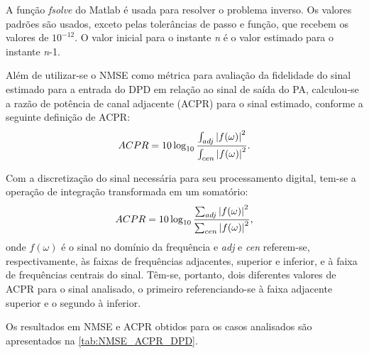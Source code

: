 A função \textit{fsolve} do Matlab é usada para resolver o problema inverso. Os valores padrões são usados, exceto pelas tolerâncias de passo e função, que recebem os valores de {$10^{-12}$}. O valor inicial para o instante \textit{n} é o valor estimado para o instante \textit{n}-1.

Além de utilizar-se o NMSE como métrica para avaliação da fidelidade do sinal estimado para a entrada do DPD em relação ao sinal de saída do PA, calculou-se a razão de potência de canal adjacente (ACPR) para o sinal estimado, conforme a seguinte definição de ACPR:
\begin{equation}
ACPR = 10\log_{10}\frac
{\int_{adj}\abs{f(\omega)}^{2}}
{\int_{cen}\abs{f(\omega)}^{2}}.
\label{acprdisc_int}
\end{equation}

Com a discretização do sinal necessária para seu processamento digital, tem-se a operação de integração transformada em um somatório:
\begin{equation}
ACPR = 10\log_{10}\frac
{\sum_{adj}\abs{f(\omega)}^{2}}
{\sum_{cen}\abs{f(\omega)}^{2}},
\label{acprdisc}
\end{equation}
onde $f(\omega)$ é o sinal no domínio da frequência e \textit{adj} e \textit{cen} referem-se, respectivamente, às faixas de frequências adjacentes, superior e inferior, e à faixa de frequências centrais do sinal. Têm-se, portanto, dois diferentes valores de ACPR para o sinal analisado, o primeiro referenciando-se à faixa adjacente superior e o segundo à inferior.

Os resultados em NMSE e ACPR obtidos para os casos analisados são apresentados na \autoref{tab:NMSE_ACPR_DPD}.


